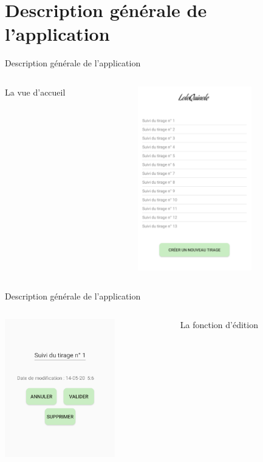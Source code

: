 \documentclass{beamer}
\begin{document}
\section{Description générale de l'application}

\begin{frame}{Description générale de l'application}
    \begin{columns}[T] %
     \begin{column}[c]{5cm} %
     La vue d'accueil
     \end{column}
     \begin{column}[c]{5cm} %
          \includegraphics[height=8cm]{Images/accueil.png}
     \end{column}
     \end{columns}
\end{frame}

\begin{frame}{Description générale de l'application}
    \begin{columns}[T]
    \begin{column}[c]{5cm}
        \includegraphics[height=6cm]{Images/edition.png}
    \end{column}
    \begin{column}[c]{5cm}
    La fonction d'édition
    \end{column}
    \end{columns}
\end{frame}
\end{document}
